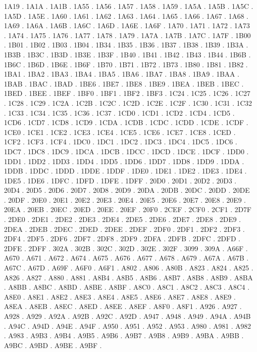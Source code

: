 1A19 .
1A1A .
1A1B .
1A55 .
1A56 .
1A57 .
1A58 .
1A59 .
1A5A .
1A5B .
1A5C .
1A5D .
1A5E .
1A60 .
1A61 .
1A62 .
1A63 .
1A64 .
1A65 .
1A66 .
1A67 .
1A68 .
1A69 .
1A6A .
1A6B .
1A6C .
1A6D .
1A6E .
1A6F .
1A70 .
1A71 .
1A72 .
1A73 .
1A74 .
1A75 .
1A76 .
1A77 .
1A78 .
1A79 .
1A7A .
1A7B .
1A7C .
1A7F .
1B00 .
1B01 .
1B02 .
1B03 .
1B04 .
1B34 .
1B35 .
1B36 .
1B37 .
1B38 .
1B39 .
1B3A .
1B3B .
1B3C .
1B3D .
1B3E .
1B3F .
1B40 .
1B41 .
1B42 .
1B43 .
1B44 .
1B6B .
1B6C .
1B6D .
1B6E .
1B6F .
1B70 .
1B71 .
1B72 .
1B73 .
1B80 .
1B81 .
1B82 .
1BA1 .
1BA2 .
1BA3 .
1BA4 .
1BA5 .
1BA6 .
1BA7 .
1BA8 .
1BA9 .
1BAA .
1BAB .
1BAC .
1BAD .
1BE6 .
1BE7 .
1BE8 .
1BE9 .
1BEA .
1BEB .
1BEC .
1BED .
1BEE .
1BEF .
1BF0 .
1BF1 .
1BF2 .
1BF3 .
1C24 .
1C25 .
1C26 .
1C27 .
1C28 .
1C29 .
1C2A .
1C2B .
1C2C .
1C2D .
1C2E .
1C2F .
1C30 .
1C31 .
1C32 .
1C33 .
1C34 .
1C35 .
1C36 .
1C37 .
1CD0 .
1CD1 .
1CD2 .
1CD4 .
1CD5 .
1CD6 .
1CD7 .
1CD8 .
1CD9 .
1CDA .
1CDB .
1CDC .
1CDD .
1CDE .
1CDF .
1CE0 .
1CE1 .
1CE2 .
1CE3 .
1CE4 .
1CE5 .
1CE6 .
1CE7 .
1CE8 .
1CED .
1CF2 .
1CF3 .
1CF4 .
1DC0 .
1DC1 .
1DC2 .
1DC3 .
1DC4 .
1DC5 .
1DC6 .
1DC7 .
1DC8 .
1DC9 .
1DCA .
1DCB .
1DCC .
1DCD .
1DCE .
1DCF .
1DD0 .
1DD1 .
1DD2 .
1DD3 .
1DD4 .
1DD5 .
1DD6 .
1DD7 .
1DD8 .
1DD9 .
1DDA .
1DDB .
1DDC .
1DDD .
1DDE .
1DDF .
1DE0 .
1DE1 .
1DE2 .
1DE3 .
1DE4 .
1DE5 .
1DE6 .
1DFC .
1DFD .
1DFE .
1DFF .
20D0 .
20D1 .
20D2 .
20D3 .
20D4 .
20D5 .
20D6 .
20D7 .
20D8 .
20D9 .
20DA .
20DB .
20DC .
20DD .
20DE .
20DF .
20E0 .
20E1 .
20E2 .
20E3 .
20E4 .
20E5 .
20E6 .
20E7 .
20E8 .
20E9 .
20EA .
20EB .
20EC .
20ED .
20EE .
20EF .
20F0 .
2CEF .
2CF0 .
2CF1 .
2D7F .
2DE0 .
2DE1 .
2DE2 .
2DE3 .
2DE4 .
2DE5 .
2DE6 .
2DE7 .
2DE8 .
2DE9 .
2DEA .
2DEB .
2DEC .
2DED .
2DEE .
2DEF .
2DF0 .
2DF1 .
2DF2 .
2DF3 .
2DF4 .
2DF5 .
2DF6 .
2DF7 .
2DF8 .
2DF9 .
2DFA .
2DFB .
2DFC .
2DFD .
2DFE .
2DFF .
302A .
302B .
302C .
302D .
302E .
302F .
3099 .
309A .
A66F .
A670 .
A671 .
A672 .
A674 .
A675 .
A676 .
A677 .
A678 .
A679 .
A67A .
A67B .
A67C .
A67D .
A69F .
A6F0 .
A6F1 .
A802 .
A806 .
A80B .
A823 .
A824 .
A825 .
A826 .
A827 .
A880 .
A881 .
A8B4 .
A8B5 .
A8B6 .
A8B7 .
A8B8 .
A8B9 .
A8BA .
A8BB .
A8BC .
A8BD .
A8BE .
A8BF .
A8C0 .
A8C1 .
A8C2 .
A8C3 .
A8C4 .
A8E0 .
A8E1 .
A8E2 .
A8E3 .
A8E4 .
A8E5 .
A8E6 .
A8E7 .
A8E8 .
A8E9 .
A8EA .
A8EB .
A8EC .
A8ED .
A8EE .
A8EF .
A8F0 .
A8F1 .
A926 .
A927 .
A928 .
A929 .
A92A .
A92B .
A92C .
A92D .
A947 .
A948 .
A949 .
A94A .
A94B .
A94C .
A94D .
A94E .
A94F .
A950 .
A951 .
A952 .
A953 .
A980 .
A981 .
A982 .
A983 .
A9B3 .
A9B4 .
A9B5 .
A9B6 .
A9B7 .
A9B8 .
A9B9 .
A9BA .
A9BB .
A9BC .
A9BD .
A9BE .
A9BF .
